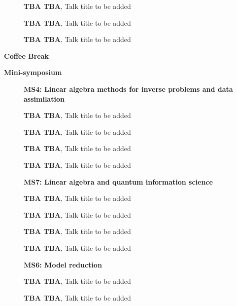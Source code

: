 \documentclass[ILAS2025-program.tex]{subfiles}
\begin{document}
\begin{description}
\begin{description}
        \item[] \textbf{TBA TBA}, Talk title to be added
        \item[] \textbf{TBA TBA}, Talk title to be added
        \item[] \textbf{TBA TBA}, Talk title to be added
        \end{description}
    \item[\info{15:30\textrm{--}16:00}] \textbf{Coffee Break} 
    \item[\info{16:00\textrm{--}18:00}] \textbf{Mini-symposium} 
    \begin{description}
    \item[] \textbf{MS4: Linear algebra methods for inverse problems and data assimilation} 
    \item[] \textbf{TBA TBA}, Talk title to be added
        \item[] \textbf{TBA TBA}, Talk title to be added
        \item[] \textbf{TBA TBA}, Talk title to be added
        \item[] \textbf{TBA TBA}, Talk title to be added
        \end{description}
    \begin{description}
    \item[] \textbf{MS7: Linear algebra and quantum information science} 
    \item[] \textbf{TBA TBA}, Talk title to be added
        \item[] \textbf{TBA TBA}, Talk title to be added
        \item[] \textbf{TBA TBA}, Talk title to be added
        \item[] \textbf{TBA TBA}, Talk title to be added
        \end{description}
    \begin{description}
    \item[] \textbf{MS6: Model reduction} 
    \item[] \textbf{TBA TBA}, Talk title to be added
        \item[] \textbf{TBA TBA}, Talk title to be added

\end{description}
\end{description}
\end{document}
